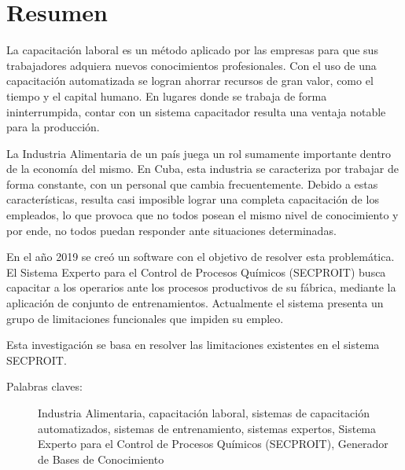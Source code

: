 \section*{Resumen}
La capacitación laboral es un método aplicado por las empresas para que sus trabajadores adquiera nuevos conocimientos profesionales. Con el uso de una capacitación automatizada se logran ahorrar recursos de gran valor, como el tiempo y el capital humano.
En lugares donde se trabaja de forma ininterrumpida, contar con un sistema capacitador resulta una ventaja notable para la producción.

La Industria Alimentaria de un país juega un rol sumamente importante dentro de la economía del mismo. En Cuba, esta industria se caracteriza por trabajar de forma constante, con un personal que cambia frecuentemente. Debido a estas características, resulta casi imposible lograr una completa capacitación de los empleados, lo que provoca que no todos posean el mismo nivel de conocimiento y por ende, no todos puedan responder ante situaciones determinadas.

En el año 2019 se creó un software con el objetivo de resolver esta problemática. El Sistema Experto para el Control de Procesos Químicos (SECPROIT) busca capacitar a los operarios ante los procesos productivos de su fábrica, mediante la aplicación de conjunto de entrenamientos. Actualmente el sistema presenta un grupo de limitaciones funcionales que impiden su empleo.

Esta investigación se basa en resolver las limitaciones existentes en el sistema SECPROIT.


\vfill

\begin{description}
	\item[Palabras claves:]{Industria Alimentaria, capacitación laboral, sistemas de capacitación automatizados, sistemas de entrenamiento, sistemas expertos, Sistema Experto para el Control de Procesos Químicos (SECPROIT), Generador de Bases de Conocimiento}
\end{description}


